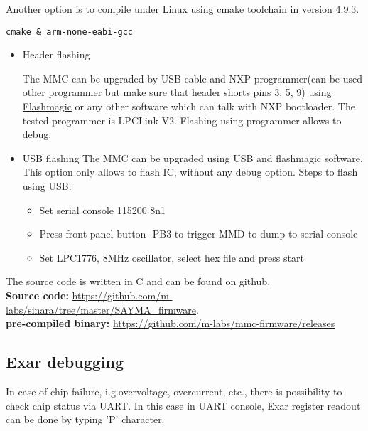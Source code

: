 Another option is to compile under Linux using cmake toolchain in version 4.9.3.
\begin{lstlisting}
cmake & arm-none-eabi-gcc
\end{lstlisting}

\begin{itemize}
	\item Header flashing

The MMC can be upgraded by USB cable and NXP programmer(can be used other programmer but make sure that header shorts pins 3, 5, 9) using  \href{http://www.flashmagictool.com/}{Flashmagic} or any other software which can talk with NXP bootloader. The tested programmer is LPCLink V2. Flashing using programmer allows to debug.

	\item USB flashing
The MMC can be upgraded using USB and flashmagic software. This option only allows to flash IC, without any debug option.
Steps to flash using USB:
\begin{itemize}
	\item Set serial console 115200 8n1
	\item Press front-panel button -PB3 to trigger MMD to dump to serial console
	\item Set LPC1776, 8MHz oscillator, select hex file and press start
\end{itemize}

\end{itemize}

The source code is written in C and can be found on github.\\ 
\textbf{Source code:} \href{https://github.com/m-labs/sinara/tree/master/SAYMA\_firmware}{https://github.com/m-labs/sinara/tree/master/SAYMA\_firmware}.\\
\textbf{pre-compiled binary:} \href{https://github.com/m-labs/mmc-firmware/releases}{https://github.com/m-labs/mmc-firmware/releases}\\



%

\subsection{Exar debugging}
 
In case of chip failure, i.g.overvoltage, overcurrent, etc., there is possibility  to check chip status via UART. In this case in UART console, Exar register readout can be done by typing 'P' character.\\

